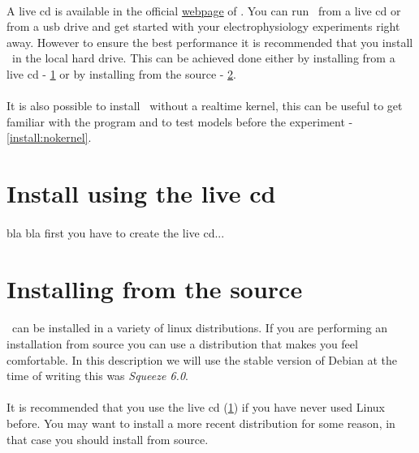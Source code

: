 \paragraph{}
A live cd is available in the official \href{http://www.tnb.ua.ac.be}{webpage} of \progname. You can run \progname\ from a live cd or from a usb drive and get started with your electrophysiology experiments right away. However to ensure the best performance it is recommended that you install \progname\ in the local hard drive. This can be achieved done either by installing from a live cd - \ref{install:live_cd} or by installing from the source - \ref{install:source}.
\paragraph{}
It is also possible to install \progname\ without a realtime kernel, this can be useful to get familiar with the program and to test models before the experiment - \ref{install:nokernel}.

\section{Install using the live cd}
\label{install:live_cd}

\paragraph{}
bla bla first you have to create the live cd...

\section{Installing from the source}
\label{install:source}

\paragraph{}
\texttt{\progname}\ can be installed in a variety of linux distributions. If you are performing an installation from source you can use a distribution that makes you feel comfortable. In this description we will use the stable version of Debian at the time of writing this was \emph{Squeeze 6.0}.
\paragraph{}
 It is recommended that you use the live cd (\ref{install:live_cd}) if you have never used Linux before. You may want to install a more recent distribution for some reason, in that case you should install from source.
